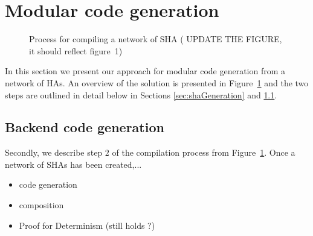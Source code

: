 \section{Modular code generation}
\label{sec:codeGen}

\begin{figure}[t!]
	\centering
	\scalebox{0.7}{
		
	}
	\caption{Process for compiling a network of \acf{SHA} ( UPDATE THE FIGURE, it should reflect figure~1)}
	\label{fig:compilingHA}
\end{figure}

In this section we present our approach for modular code generation from
a network of \acp{HA}. 
An overview of the solution is presented in Figure~\ref{fig:compilingHA} and the two steps are outlined in detail below in Sections \ref{sec:shaGeneration} and \ref{sec:backendCodeGeneration}.



\subsection{Backend code generation}
\label{sec:backendCodeGeneration}

Secondly, we describe step $2$ of the compilation process from Figure~\ref{fig:compilingHA}. Once a network of \acp{SHA} has been created,...

\begin{itemize}
	\item code generation
	\item composition
	\item Proof for Determinism (still holds ?)
\end{itemize}